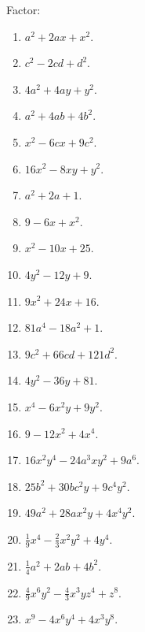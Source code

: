 \documentclass{book}
\begin{document}
Factor:
\begin{enumerate}
\item $a^2 + 2ax + x^2$.

\item $c^2 - 2cd + d^2$.

\item $4a^2 + 4ay + y^2$.

\item $a^2 + 4ab + 4b^2$.

\item $x^2 - 6cx + 9c^2$.

\item $16x^2 - 8xy + y^2$.

\item $a^2 + 2a + 1$.

\item $9 - 6x + x^2$.

\item $x^2 - 10x + 25$.

\item $4y^2 - 12y + 9$.

\item $9x^2 + 24x + 16$.

\item $81a^4 - 18a^2 + 1$.

\item $9c^2 + 66cd + 121d^2$.

\item $4y^2 - 36y + 81$.

\item $x^4 - 6x^2y + 9y^2$.

\item $9 - 12x^2 + 4x^4$.

\item $16x^2y^4 - 24a^3xy^2 + 9a^6$.

\item $25b^2 + 30bc^2y + 9c^4y^2$.

\item $49a^2 + 28ax^2y + 4x^4y^2$.

\item $\frac{1}{9}x^4 - \frac{2}{3}x^2y^2 + 4y^4$.

\item $\frac{1}{4}a^2 + 2ab + 4b^2$.

\item $\frac{4}{9}x^6y^2 - \frac{4}{3}x^3yz^4 + z^8$.

\item $x^9 - 4x^6y^4 + 4x^3y^8$.


\end{enumerate}
\end{document}
